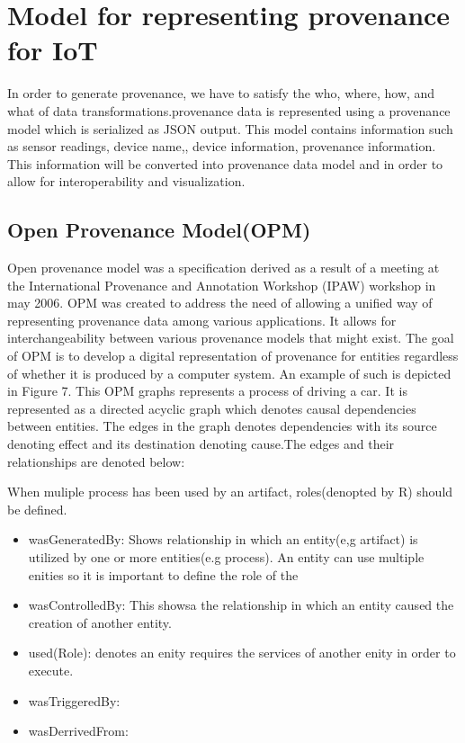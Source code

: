 \section{Model for representing provenance for IoT}

In order to generate provenance, we have to satisfy the who, where, how, and what of data transformations.provenance data is represented using a provenance model which is serialized as JSON output. This model contains information such as sensor readings, device name,, device information, provenance information. This information will be converted into provenance data model and in order to allow for interoperability and visualization.

\subsection{Open Provenance Model(OPM)}

Open provenance model was a specification derived as a result of a meeting at the International Provenance and Annotation Workshop (IPAW) workshop in may 2006. OPM was created to address the need of allowing a unified way of representing provenance data among various applications. It allows for interchangeability between various provenance models that might exist. The goal of OPM is to develop a digital representation of provenance for entities regardless of whether it is produced by a computer system. An example of such is depicted in Figure 7. This OPM graphs represents a process of driving a car. It is represented as a directed acyclic graph which denotes causal dependencies between entities. The edges in the graph denotes dependencies with its source denoting effect and its destination denoting cause.The edges and their relationships are denoted below: 

When muliple process has been used by an artifact, roles(denopted by R) should be defined.

\begin{itemize}
\item wasGeneratedBy: Shows relationship in which an entity(e,g artifact) is utilized by one or  more entities(e.g process). An entity can use multiple enities so it is important to define the role of the  
\item wasControlledBy: This showsa the relationship in which an entity caused the creation of another entity.
\item used(Role): denotes an enity requires the services of another enity in order to execute.
\item wasTriggeredBy: 
\item wasDerrivedFrom:
\end{itemize}

